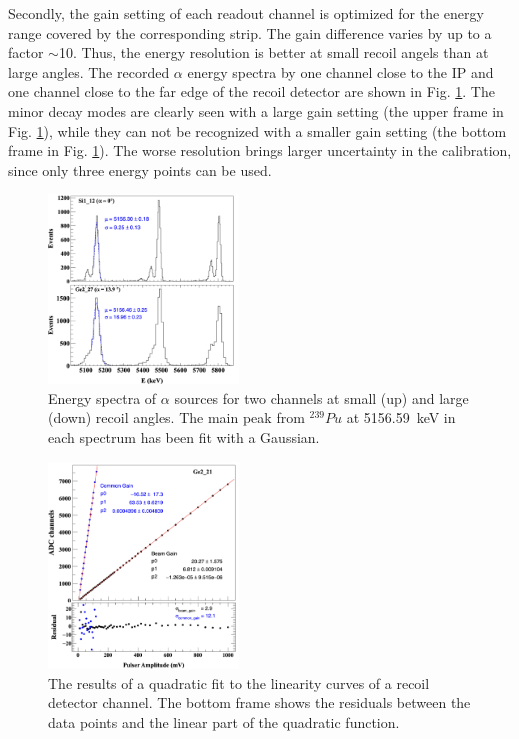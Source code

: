 \documentclass[number,5p]{elsarticle}
\begin{document}
Secondly, the gain setting of each readout channel is optimized for the energy range covered by the corresponding strip.
The gain difference varies by up to a factor $\mathtt{\sim}$10.
Thus, the energy resolution is better at small recoil angels than at large angles.
The recorded $\alpha$ energy spectra by one channel close to the IP and one
channel close to the far edge of the recoil detector are shown in Fig. \ref{fig:alpha_spectrum}.
The minor decay modes are clearly seen with a large gain setting (the upper
frame in Fig. \ref{fig:alpha_spectrum}), while they can not be recognized with a
smaller gain setting (the bottom frame in Fig. \ref{fig:alpha_spectrum}).
The worse resolution brings larger uncertainty in the calibration, since only three energy points can be used.
\begin{figure}[h!]
  \centering
  \includegraphics[width=0.45\textwidth]{./alpha_comparison_corrected_fit_separate.png}
  \caption{Energy spectra of \(\alpha\) sources for two channels at small (up)
    and large (down) recoil angles. The main peak from $^{239}Pu$ at
    \SI{5156.59}{\keV} in each spectrum has been fit with a Gaussian.}
  \label{fig:alpha_spectrum}
\end{figure}

\begin{figure}[h!]
  \centering
  \includegraphics[width=0.45\textwidth]{./linearity_quadratic_residual.png}
  \caption{The results of a quadratic fit to the linearity curves of a recoil
    detector channel. The bottom frame shows the residuals between the data
    points and the linear part of the quadratic function.}
  \label{fig:electronic_linearity}
\end{figure}
\end{document}

